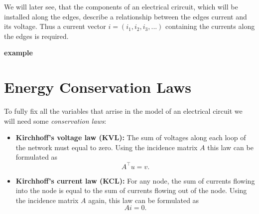 We will later see, that the components of an electrical crircuit, which will be installed along the edges, describe a relationship between the edges current and its voltage. Thus a current vector $i = (i_1, i_2, i_3, ...)$ containing the currents along the edges is required.

\textbf{example}

\section{Energy Conservation Laws}
To fully fix all the variables that arrise in the model of an electrical circuit we will need some \emph{conservation laws}:
\begin{itemize}
	\item \textbf{Kirchhoff's voltage law (KVL):} \newline
	The sum of voltages along each loop of the network must equal to zero. Using the incidence matrix $A$ this law can be formulated as
	\begin{equation}
		\label{KVL}
		A^\top  u = v.
	\end{equation}
	\item \textbf{Kirchhoff's current law (KCL):} \newline
	For any node, the sum of currents flowing into the node is equal to the sum of currents flowing out of the node. Using the incidence matrix $A$ again, this law can be formulated as
	\begin{equation}
		\label{KCL}
		A  i = 0.
	\end{equation}
\end{itemize}

